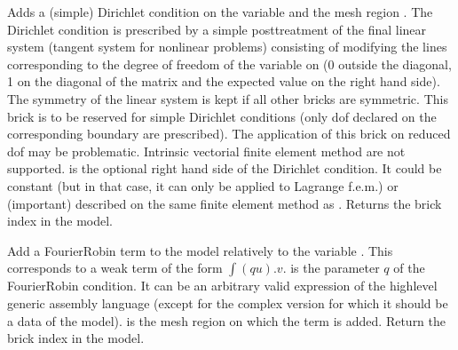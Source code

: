 \documentclass[a4paper,11pt,english]{sphinxmanual}
\begin{document}
\begin{fulllineitems}
\begin{fulllineitems}
\label{\detokenize{python/cmdref_Model:getfem.Model.add_Dirichlet_condition_with_simplification}}
Adds a (simple) Dirichlet condition on the variable  and
the mesh region . The Dirichlet condition is prescribed by
a simple post\sphinxhyphen{}treatment of the final linear system (tangent system
for nonlinear problems) consisting of modifying the lines corresponding
to the degree of freedom of the variable on  (0 outside the
diagonal, 1 on the diagonal of the matrix and the expected value on
the right hand side).
The symmetry of the linear system is kept if all other bricks are
symmetric.
This brick is to be reserved for simple Dirichlet conditions (only dof
declared on the corresponding boundary are prescribed). The application
of this brick on reduced dof may be problematic. Intrinsic vectorial
finite element method are not supported. 
 is the optional right hand side of  the Dirichlet condition.
It could be constant (but in that case, it can only be applied to
Lagrange f.e.m.) or (important) described on the same finite
element method as .
Returns the brick index in the model.

\end{fulllineitems}


\begin{fulllineitems}
\label{\detokenize{python/cmdref_Model:getfem.Model.add_Fourier_Robin_brick}}
Add a Fourier\sphinxhyphen{}Robin term to the model relatively to the variable
. This corresponds to a weak term of the form
\(\int (qu).v\).  is the parameter \(q\) of
the Fourier\sphinxhyphen{}Robin condition.  It can be an arbitrary valid expression
of the high\sphinxhyphen{}level generic assembly language (except for the complex version
for which it should be a data of the model).  is the mesh region
on which the term is added. Return the brick index in the model.


\end{fulllineitems}
\end{fulllineitems}
\end{document}
